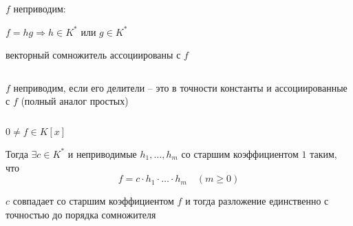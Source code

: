     \par \quad $f$ неприводим:
    \par \quad \quad $f = hg \Rightarrow h \in K^*$ или $g \in K^*$
    \par \quad \quad векторный сомножитель ассоциированы с $f$
    \par $ $
    \par \quad $f$ неприводим, если его делители -- это в точности константы и ассоциированные с $f$ (полный аналог простых)

    \begin{theorem}[ОТА]
        $ $
        \par \quad $0 \not = f \in K[x]$
        \par \quad Тогда $\exists c \in K^*$ и неприводимые $h_1, \dots, h_m$ со старшим коэффициентом $1$ таким, что
        \[
            f = c \cdot h_1 \cdot \ldots \cdot h_m \quad (m \ge 0)    
        \]
        \par \quad $c$ совпадает со старшим коэффициентом $f$ и тогда разложение единственно с точностью до порядка сомножителя
    \end{theorem}

